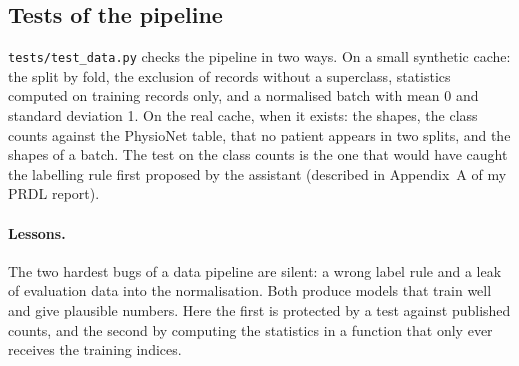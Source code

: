 \subsection{Tests of the pipeline}

\texttt{tests/test\_data.py} checks the pipeline in two ways. On a small synthetic cache: the split by fold,
the exclusion of records without a superclass, statistics computed on training records only, and a
normalised batch with mean 0 and standard deviation 1. On the real cache, when it exists: the shapes, the
class counts against the PhysioNet table, that no patient appears in two splits, and the shapes of a batch.
The test on the class counts is the one that would have caught the labelling rule first proposed by the
assistant (described in Appendix~A of my PRDL report).

\paragraph{Lessons.} The two hardest bugs of a data pipeline are silent: a wrong label rule and a leak of
evaluation data into the normalisation. Both produce models that train well and give plausible numbers.
Here the first is protected by a test against published counts, and the second by computing the
statistics in a function that only ever receives the training indices.
